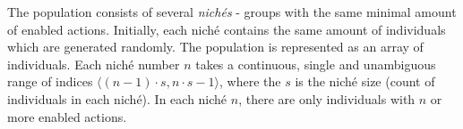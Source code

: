 The population consists of several {\em nichés} - groups with the same minimal amount of enabled actions. Initially, each niché contains the same amount of individuals which are generated randomly. The population is represented as an array of individuals. Each niché number $n$ takes a continuous, single and unambiguous range of indices $\langle (n-1) \cdot s, n \cdot s - 1 \rangle$, where the $s$ is the niché size (count of individuals in each niché). In each niché $n$, there are only individuals with $n$ or more enabled actions. 

\begin{figure}
\centering
{} \hspace{1em}
\end{figure}
